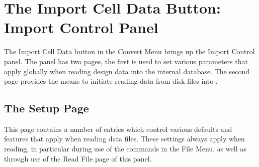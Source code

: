 \section{The {\cb Import Cell Data} Button: {\cb Import Control} Panel}
\label{cvimport}

The {\cb Import Cell Data} button in the {\cb Convert Menu} brings
up the {\cb Import Control} panel.  The panel has two pages, the first
is used to set various parameters that apply globally when reading
design data into the {\Xic} internal database.  The second page
provides the means to initiate reading data from disk files into
{\Xic}.

\subsection{The {\cb Setup} Page}

This page contains a number of entries which control various defaults
and features that apply when reading data files.  These settings
always apply when reading, in particular during use of the commands in
the {\cb File Menu}, as well as through use of the {\cb Read File}
page of this panel.

